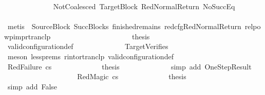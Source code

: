 \begin{isabellebody}
\ \ \ \ \ \ \ \ \ \ \ \ \isamarkupfalse%
\ NotCoalesced\ TargetBlock\ RedNormalReturn\ NoSuccEq\isanewline
\ \ \ \ \ \ \ \ \ \ \ \ \isamarkupfalse%
\ {\isacharparenleft}{\kern0pt}metis\ {\isachardoublequoteopen}{}{\isachardoublequoteclose}{\isacharparenleft}{\kern0pt}{}{\isacharparenright}{\kern0pt}\ SourceBlock\ SuccBlocks\ finished{\isacharunderscore}{\kern0pt}remains\ red{\isacharunderscore}{\kern0pt}cfg{\isachardot}{\kern0pt}RedNormalReturn\ relpowp{\isacharunderscore}{\kern0pt}imp{\isacharunderscore}{\kern0pt}rtranclp{\isacharparenright}{\kern0pt}\isanewline
\ \ \ \ \ \ \ \ \isanewline
\ \ \ \ \ \ \ \ \ \ \isamarkupfalse%
\ \isamarkupfalse%
\ {\isacharquery}{\kern0pt}thesis\isanewline
\ \ \ \ \ \ \ \ \ \ \ \ \isamarkupfalse%
\ valid{\isacharunderscore}{\kern0pt}configuration{\isacharunderscore}{\kern0pt}def\isanewline
\ \ \ \ \ \ \ \ \ \ \ \ \isamarkupfalse%
\ TargetVerifies\isanewline
\ \ \ \ \ \ \ \ \ \ \ \ \isamarkupfalse%
\ {\isacharparenleft}{\kern0pt}meson\ less{\isachardot}{\kern0pt}prems{\isacharparenleft}{\kern0pt}{}{\isacharparenright}{\kern0pt}\ r{\isacharunderscore}{\kern0pt}into{\isacharunderscore}{\kern0pt}rtranclp\ valid{\isacharunderscore}{\kern0pt}configuration{\isacharunderscore}{\kern0pt}def{\isacharparenright}{\kern0pt}\isanewline
\ \ \ \ \ \ \ \ \isamarkupfalse%
\isanewline
\ \ \ \ \ \ \ \ \ \ \isamarkupfalse%
\ {\isacharparenleft}{\kern0pt}RedFailure\ cs{\isacharparenright}{\kern0pt}\isanewline
\ \ \ \ \ \ \ \ \ \ \isamarkupfalse%
\ \isamarkupfalse%
\ {\isacharquery}{\kern0pt}thesis\isanewline
\ \ \ \ \ \ \ \ \ \ \ \ \isamarkupfalse%
\ {\isacharparenleft}{\kern0pt}simp\ add{\isacharcolon}{\kern0pt}\ OneStepResult{\isacharparenright}{\kern0pt}\isanewline
\ \ \ \ \ \ \ \ \isamarkupfalse%
\isanewline
\ \ \ \ \ \ \ \ \ \ \isamarkupfalse%
\ {\isacharparenleft}{\kern0pt}RedMagic\ cs{\isacharparenright}{\kern0pt}\isanewline
\ \ \ \ \ \ \ \ \ \ \isamarkupfalse%
\ \isamarkupfalse%
\ {\isacharquery}{\kern0pt}thesis\isanewline
\ \ \ \ \ \ \ \ \ \ \ \ \isamarkupfalse%
\ {\isacharparenleft}{\kern0pt}simp\ add{\isacharcolon}{\kern0pt}\ False{\isacharparenright}{\kern0pt}\isanewline
\ \ \ \ \ \ \ \ \isamarkupfalse%
\isanewline
\ \ \ \ \ \ \isamarkupfalse%

\end{isabellebody}
